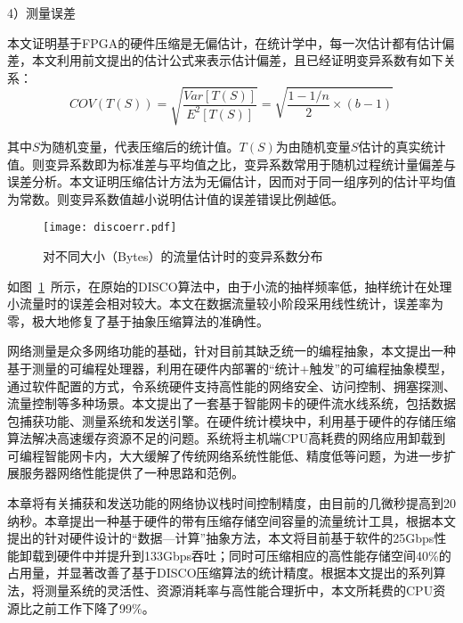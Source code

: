 4）测量误差

本文证明基于FPGA的硬件压缩是无偏估计，在统计学中，每一次估计都有估计偏差，本文利用前文提出的估计公式来表示估计偏差，且已经证明变异系数有如下关系：
\begin{equation} \label{mydiscofl}
COV(T(S))=\sqrt{\dfrac{Var[T(S)]}{E^2[T(S)]}}=\sqrt{\dfrac{1-1/n}{2}\times (b-1)}
\end{equation}

其中$ S $为随机变量，代表压缩后的统计值。$ T(S) $为由随机变量$ S $估计的真实统计值。则变异系数即为标准差与平均值之比，变异系数常用于随机过程统计量偏差与误差分析。本文证明压缩估计方法为无偏估计，因而对于同一组序列的估计平均值为常数。则变异系数值越小说明估计值的误差错误比例越低。

\begin{figure}[!ht]
	\centering 
	\vspace{-1.5mm} 
	\texttt{[image: discoerr.pdf]}
	\caption{对不同大小（Bytes）的流量估计时的变异系数分布} \label{fig:discoerr}
\end{figure}


如图~\ref{fig:discoerr}~所示，在原始的DISCO算法中，由于小流的抽样频率低，抽样统计在处理小流量时的误差会相对较大。本文在数据流量较小阶段采用线性统计，误差率为零，极大地修复了基于抽象压缩算法的准确性。


\label{chap38}


网络测量是众多网络功能的基础，针对目前其缺乏统一的编程抽象，本文提出一种基于测量的可编程处理器，利用在硬件内部署的“统计+触发”的可编程抽象模型，通过软件配置的方式，令系统硬件支持高性能的网络安全、访问控制、拥塞探测、流量控制等多种场景。本文提出了一套基于智能网卡的硬件流水线系统，包括数据包捕获功能、测量系统和发送引擎。在硬件统计模块中，利用基于硬件的存储压缩算法解决高速缓存资源不足的问题。系统将主机端CPU高耗费的网络应用卸载到可编程智能网卡内，大大缓解了传统网络系统性能低、精度低等问题，为进一步扩展服务器网络性能提供了一种思路和范例。

本章将有关捕获和发送功能的网络协议栈时间控制精度，由目前的几微秒提高到20纳秒。本章提出一种基于硬件的带有压缩存储空间容量的流量统计工具，根据本文提出的针对硬件设计的“数据---计算”抽象方法，本文将目前基于软件的25Gbps性能卸载到硬件中并提升到133Gbps吞吐；同时可压缩相应的高性能存储空间40\%的占用量，并显著改善了基于DISCO压缩算法的统计精度。根据本文提出的系列算法，将测量系统的灵活性、资源消耗率与高性能合理折中，本文所耗费的CPU资源比之前工作下降了99\%。















